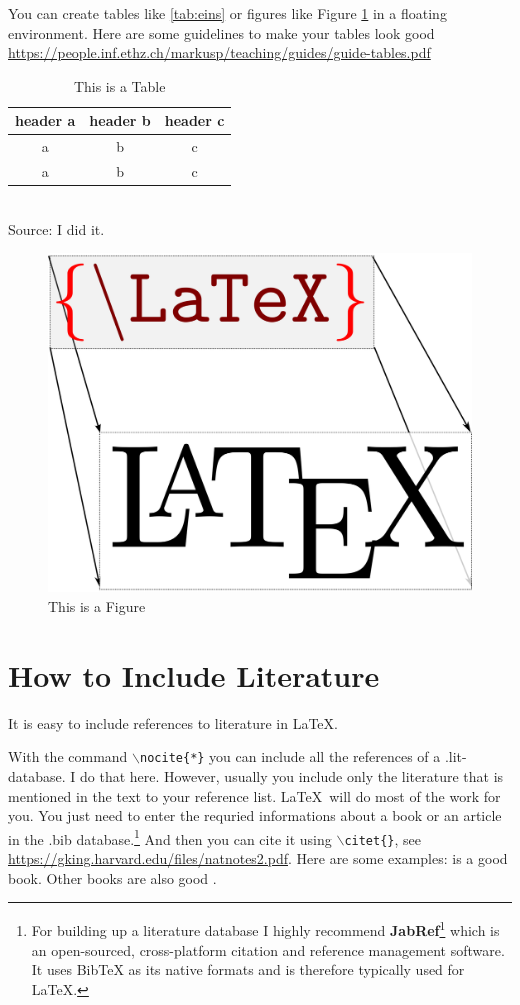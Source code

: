 \documentclass{article}
\begin{document}
You can create tables like \autoref{tab:eins} or figures like Figure \ref{fig:latexcover} in a floating environment. Here are some guidelines to make your tables look good  \url{https://people.inf.ethz.ch/markusp/teaching/guides/guide-tables.pdf}	

\begin{table}
	\begin{center}
		\caption{This is a Table}\label{tab:eins}
		\begin{tabular}{ c c c }\toprule
			header a & header b & header c \\\midrule
			a & b & c \\
			a & b & c \\\bottomrule
		\end{tabular}\\[.5em]
\tiny Source: I did it.
	\end{center}
\end{table}

\begin{figure}
	\centering
	\includegraphics[width=0.4\linewidth]{LaTeX_cover}
	\caption{This is a Figure}\label{fig:latexcover}
\end{figure}


	
	\section{How to Include Literature}\label{conclusions}
It is easy to include references to literature in \LaTeX.

With the command \texttt{$\backslash$nocite\{*\}} you can include all the references of a .lit-database. I do that here. However, usually you include only the literature that is mentioned in the text to your reference list. \LaTeX\ will do most of the work for you. You just need to enter the requried informations about a book or an article in the .bib database.\footnote{For building up a literature database I highly recommend \textbf{JabRef}\footnote{\url{www.jabref.org}} which is an open-sourced, cross-platform citation and reference management software. It uses BibTeX as its native formats and is therefore typically used for \LaTeX.} And then you can cite it using \texttt{$\backslash$citet\{\}}, see \url{https://gking.harvard.edu/files/natnotes2.pdf}.
Here are some examples:
\citet[][]{Wickham2016R} is a good book.
Other books are also good \citep[see][]{Lilja2016Linear, Matloff2011Art}.
\end{document}
